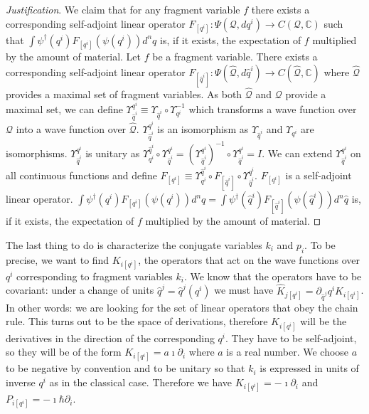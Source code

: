 \documentclass[smallextended]{svjour3}
\numberwithin{equation}{section}
\newenvironment{justification}{\emph{Justification}.}{\hfill\(\qed\)}
\begin{document}
\begin{justification}
	We claim that for any fragment variable $f$ there exists a corresponding self-adjoint linear operator $F_{[q^i]} : \Psi(\mathcal{Q}, dq^i) \rightarrow C(\mathcal{Q}, \mathbb{C})$ such that $\int \psi^\dagger(q^i) F_{[q^i]}( \psi(q^i)) d^nq$ is, if it exists, the expectation of $f$ multiplied by the amount of material. Let $f$ be a fragment variable. There exists a corresponding self-adjoint linear operator $F_{[\hat{q}^i]} : \Psi(\hat{\mathcal{Q}}, d\hat{q}^i) \rightarrow C(\hat{\mathcal{Q}}, \mathbb{C})$ where $\hat{\mathcal{Q}}$ provides a maximal set of fragment variables. As both $\hat{\mathcal{Q}}$ and $\mathcal{Q}$ provide a maximal set, we can define $\Upsilon^{q^i}_{\hat{q}^i} \equiv \Upsilon_{\hat{q}^i} \circ \Upsilon_{q^i}^{-1}$ which transforms a wave function over $\mathcal{Q}$ into a wave function over $\hat{\mathcal{Q}}$. $\Upsilon^{q^i}_{\hat{q}^i}$ is an isomorphism as $\Upsilon_{\hat{q}^i}$ and $\Upsilon_{q^i}$ are isomorphisms. $\Upsilon^{q^i}_{\hat{q}^i}$ is unitary as $\Upsilon^{\hat{q}^i}_{q^i} \circ \Upsilon^{q^i}_{\hat{q}^i} = (\Upsilon^{q^i}_{\hat{q}^i})^{-1} \circ \Upsilon^{q^i}_{\hat{q}^i} = I$. We can extend $\Upsilon^{q^i}_{\hat{q}^i}$ on all continuous functions and define $F_{[q^i]} \equiv \Upsilon^{\hat{q}^i}_{q^i} \circ F_{[\hat{q}^i]} \circ \Upsilon^{q^i}_{\hat{q}^i}$. $F_{[q^i]}$ is a self-adjoint linear operator. $\int \psi^\dagger(q^i) F_{[q^i]}( \psi(q^i)) d^nq = \int \psi^\dagger(\hat{q}^i) F_{[\hat{q}^i]}( \psi(\hat{q}^i)) d^n \hat{q}$ is, if it exists, the expectation of $f$ multiplied by the amount of material.
\end{justification}

The last thing to do is characterize the conjugate variables $k_i$ and $p_i$. To be precise, we want to find $K_{i [q^i]}$, the operators that act on the wave functions over $q^i$ corresponding to fragment variables $k_i$. We know that the operators have to be covariant: under a change of units $\hat{q}^j = \hat{q}^j(q^i)$ we must have $\hat{K}_{j[q^i]} = \partial_{\hat{q}^j} q^i K_{i [q^i]}$. In other words: we are looking for the set of linear operators that obey the chain rule. This turns out to be the space of derivations, therefore $K_{i [q^i]}$ will be the derivatives in the direction of the corresponding $q^i$. They have to be self-adjoint, so they will be of the form $K_{i [q^i]} = a \imath \partial_{i}$ where $a$ is a real number. We choose $a$ to be negative by convention and to be unitary so that $k_i$ is expressed in units of inverse $q^i$ as in the classical case. Therefore we have $K_{i [q^i]} = -\imath \partial_i$ and $P_{i [q^i]} = -\imath \hbar \partial_i$.
\end{document}
